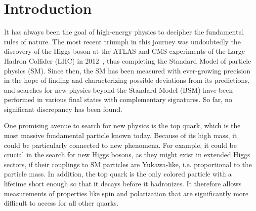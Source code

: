 \chapter{Introduction}
\label{ch:intro}


It has always been the goal of high-energy physics to decipher the fundamental rules of nature. The most recent triumph in this journey was undoubtedly the discovery of the Higgs boson at the ATLAS and CMS experiments of the Large Hadron Collider (LHC) in 2012~\cite{ATLAS:2012tfa,CMS:HIG-12-028,CMS:HIG-12-036}, thus completing the Standard Model of particle physics (SM). Since then, the SM has been measured with ever-growing precision in the hope of finding and characterizing possible deviations from its predictions, and searches for new physics beyond the Standard Model (BSM) have been performed in various final states with complementary signatures. So far, no significant discrepancy has been found.

One promising avenue to search for new physics is the top quark, which is the most massive fundamental particle known today.
Because of its high mass, it could be particularly connected to new phenomena.
For example, it could be crucial in the search for new Higgs bosons, as they might exist in extended Higgs sectors, if their couplings to SM particles are Yukawa-like, i.e. proportional to the particle mass.
In addition, the top quark is the only colored particle with a lifetime short enough so that it decays before it hadronizes. It therefore allows measurements of properties like spin and polarization that are significantly more difficult to access for all other quarks. 

\medskip


